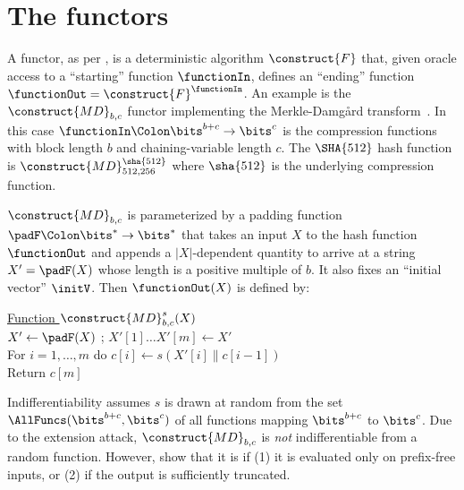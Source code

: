 \section{The functors} \label{sec-functors}

 

A functor, as per \cite{EC:BelDavGun20}, is a deterministic algorithm $\construct{F}$ that, given oracle access to a ``starting'' function $\functionIn$, defines an ``ending'' function $\functionOut = \construct{F}^{\functionIn}$. An example is the $\construct{MD}_{b,c}$ functor implementing the Merkle-Damg{\aa}rd transform~\cite{C:Merkle89a,C:Damgaard89b}. In this case $\functionIn\Colon\bits^{b+c}\to\bits^c$ is the compression functions with block length $b$ and chaining-variable length $c$. The $\SHA{512}$ hash function is $\construct{MD}_{512,256}^{\sha{512}}$ where $\sha{512}$ is the underlying compression function. 

 $\construct{MD}_{b,c}$ is parameterized by a padding function $\padF\Colon\bits^*\to\bits^*$ that takes an input $X$ to the hash function $\functionOut$ and appends a $|X|$-dependent quantity to arrive at a string $X' = \padF(X)$ whose length is a positive multiple of $b$. It also fixes an ``initial vector'' $\initV$. Then $\functionOut(X)$ is defined by:

\begin{tabbing}
\underline{Function $\construct{MD}_{b,c}^s(X)$} \\[2pt]
$X'\gets \padF(X)$ ; $X'[1]\ldots X'[m] \gets X'$  \\
For $i=1,\ldots,m$ do $c[i] \gets s(X'[i]\|c[i-1])$ \\
Return $c[m]$
\end{tabbing}

\noindent
Indifferentiability assumes $s$ is drawn at random from the set $\AllFuncs(\bits^{b+c},\bits^c)$ of all functions mapping $\bits^{b+c}$ to $\bits^c$. Due to the extension attack, $\construct{MD}_{b,c}$ is \textit{not} indifferentiable from a random function. However, \cite{C:CDMP05} show that it is if (1) it is evaluated only on prefix-free inputs, or (2) if the output is sufficiently truncated.


 